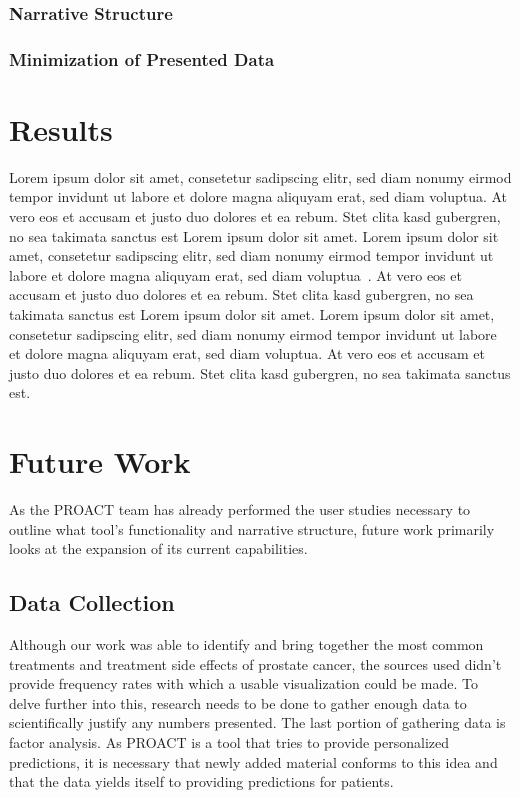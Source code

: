 \documentclass[journal]{vgtc}                %
\begin{document}
                \subsubsection{Narrative Structure}
                \subsubsection{Minimization of Presented Data}


\section{Results}

Lorem ipsum dolor sit amet, consetetur sadipscing elitr, sed diam
nonumy eirmod tempor invidunt ut labore et dolore magna aliquyam erat,
sed diam voluptua. At vero eos et accusam et justo duo dolores et ea
rebum. Stet clita kasd gubergren, no sea takimata sanctus est Lorem
ipsum dolor sit amet. Lorem ipsum dolor sit amet, consetetur
sadipscing elitr, sed diam nonumy eirmod tempor invidunt ut labore et
dolore magna aliquyam erat, sed diam
voluptua~\cite{Kitware:2003,Max:1995:OMF}. At vero eos et accusam et
justo duo dolores et ea rebum. Stet clita kasd gubergren, no sea
takimata sanctus est Lorem ipsum dolor sit amet. Lorem ipsum dolor sit
amet, consetetur sadipscing elitr, sed diam nonumy eirmod tempor
invidunt ut labore et dolore magna aliquyam erat, sed diam
voluptua. At vero eos et accusam et justo duo dolores et ea
rebum. Stet clita kasd gubergren, no sea takimata sanctus est.

\section{Future Work}
        As the PROACT team has already performed the user studies necessary to outline what tool's functionality and narrative structure, future work primarily looks at the expansion of its current capabilities.

        \subsection{Data Collection}
                Although our work was able to identify and bring together the most common treatments and treatment side effects of prostate cancer, the sources used didn't provide frequency rates with which a usable visualization could be made.
                To delve further into this, research needs to be done to gather enough data to scientifically justify any numbers presented.
                The last portion of gathering data is factor analysis.
                As PROACT is a tool that tries to provide personalized predictions, it is necessary that newly added material conforms to this idea and that the data yields itself to providing predictions for patients.
\end{document}
